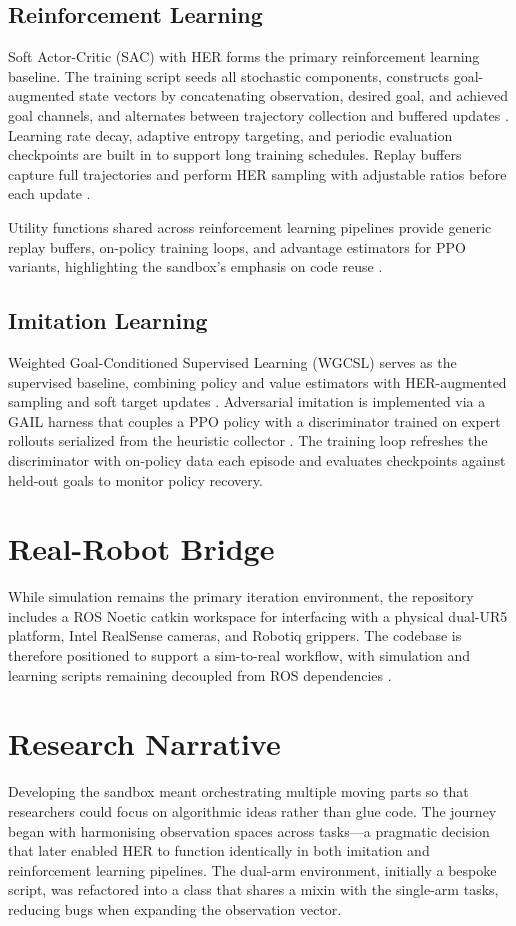 \documentclass[11pt]{article}
\begin{document}
\subsection{Reinforcement Learning}
Soft Actor-Critic (SAC) with HER forms the primary reinforcement learning baseline. The training script seeds all stochastic components, constructs goal-augmented state vectors by concatenating observation, desired goal, and achieved goal channels, and alternates between trajectory collection and buffered updates \cite{sacSetup}. Learning rate decay, adaptive entropy targeting, and periodic evaluation checkpoints are built in to support long training schedules. Replay buffers capture full trajectories and perform HER sampling with adjustable ratios before each update \cite{sacHerLoop}.

Utility functions shared across reinforcement learning pipelines provide generic replay buffers, on-policy training loops, and advantage estimators for PPO variants, highlighting the sandbox's emphasis on code reuse \cite{rlUtils}.

\subsection{Imitation Learning}
Weighted Goal-Conditioned Supervised Learning (WGCSL) serves as the supervised baseline, combining policy and value estimators with HER-augmented sampling and soft target updates \cite{wgcslCore}. Adversarial imitation is implemented via a GAIL harness that couples a PPO policy with a discriminator trained on expert rollouts serialized from the heuristic collector \cite{gailHarness}. The training loop refreshes the discriminator with on-policy data each episode and evaluates checkpoints against held-out goals to monitor policy recovery.

\section{Real-Robot Bridge}
While simulation remains the primary iteration environment, the repository includes a ROS Noetic catkin workspace for interfacing with a physical dual-UR5 platform, Intel RealSense cameras, and Robotiq grippers. The codebase is therefore positioned to support a sim-to-real workflow, with simulation and learning scripts remaining decoupled from ROS dependencies \cite{realRobot}.

\section{Research Narrative}
Developing the sandbox meant orchestrating multiple moving parts so that researchers could focus on algorithmic ideas rather than glue code. The journey began with harmonising observation spaces across tasks---a pragmatic decision that later enabled HER to function identically in both imitation and reinforcement learning pipelines. The dual-arm environment, initially a bespoke script, was refactored into a class that shares a mixin with the single-arm tasks, reducing bugs when expanding the observation vector.
\end{document}
